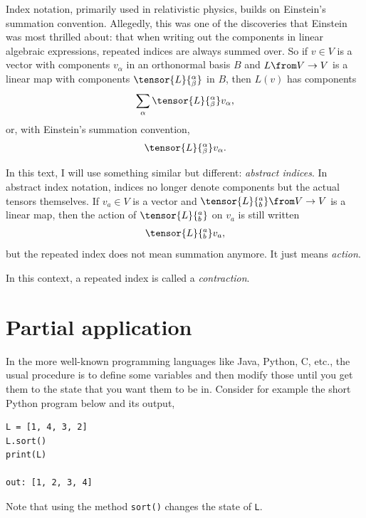 Index notation, primarily used in relativistic physics, builds on Einstein's summation convention.
Allegedly, this was one of the discoveries that Einstein was most thrilled about: that when writing out the components in linear algebraic expressions, repeated indices are always summed over.
So if $v \in V$ is a vector with components $v_\alpha$ in an orthonormal basis $B$ and $L \from V \to V$ is a linear map with components $\tensor{L}{^\alpha_\beta}$ in $B$, then $L(v)$ has components
\begin{align*}
	\sum_\alpha \tensor{L}{^\alpha_\beta} v_\alpha,
\end{align*}
or, with Einstein's summation convention,
\begin{align*}
	\tensor{L}{^\alpha_\beta} v_\alpha.
\end{align*}

In this text, I will use something similar but different: \emph{abstract indices}.
In abstract index notation, indices no longer denote components but the actual tensors themselves.
If $v_a \in V$ is a vector and $\tensor{L}{^a_b} \from V \to V$ is a linear map, then the action of $\tensor{L}{^a_b}$ on $v_a$ is still written
\begin{align*}
	\tensor{L}{^a_b} v_a,
\end{align*}
but the repeated index does not mean summation anymore.
It just means \emph{action}.

In this context, a repeated index is called a \emph{contraction}.



\section{Partial application}%
\label{sec:partial_application}

In the more well-known programming languages like Java, Python, C, etc., the usual procedure is to define some variables and then modify those until you get them to the state that you want them to be in.
Consider for example the short Python program below and its output,
\begin{verbatim}
L = [1, 4, 3, 2]
L.sort()
print(L)

out: [1, 2, 3, 4]
\end{verbatim}
Note that using the method \verb|sort()| changes the state of \verb|L|.

